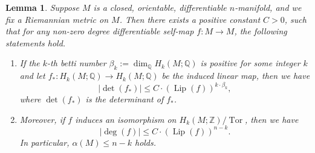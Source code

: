 \documentclass{amsart}
\newcommand{\Q}{\mathbb{Q}}
\newcommand{\Z}{\mathbb{Z}}
\newcommand{\ra}{\rightarrow}
\newcommand{\lip}{\operatorname{Lip}}
\newtheorem{lem}[thm]{Lemma}
\begin{document}
  

\begin{lem}\label{HomologyControlsFlexibleExponent}
    Suppose $M$ is a closed, orientable, differentiable $n$-manifold, and we fix a Riemannian metric on $M$. Then there exists a positive constant $C>0$, such that for any  non-zero degree differentiable self-map $f:M\ra M$, the following statements hold.
    \begin{enumerate}
        \item If the $k$-th betti number $\beta_k:=\dim_\Q H_k(M;\Q)$ is positive for some integer $k$ and let $f_*:H_k(M;\Q)\ra H_k(M;\Q)$ be the induced linear map, then we have
        \[
            |\det(f_*)|\leqslant C\cdot (\lip (f))^{k\cdot \beta_k},
        \]
        where $\det(f_*)$ is the determinant of $f_*$.
        \item Moreover, if $f$ induces an isomorphism on $H_k(M;\Z)/\operatorname{Tor}$, then we have
    \[
        |\deg (f)|\leqslant C\cdot (\lip (f))^{n-k}.
    \]
    In particular, $\alpha(M)\leqslant n-k$ holds.
    \end{enumerate}
\end{lem}
\end{document}
